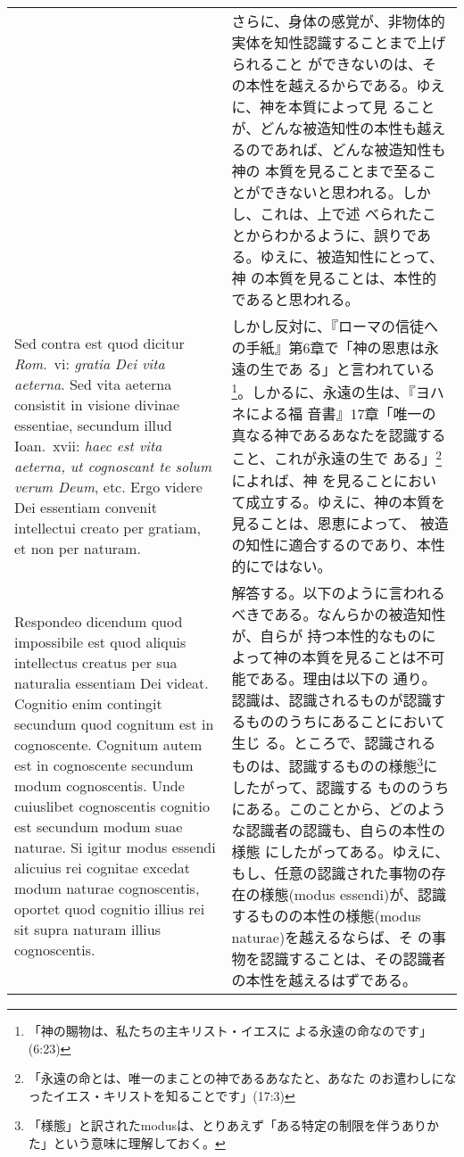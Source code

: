 \documentclass[10pt]{jsarticle} %
\begin{document}
\begin{longtable}{p{21em}p{21em}}
&

さらに、身体の感覚が、非物体的実体を知性認識することまで上げられること
ができないのは、その本性を越えるからである。ゆえに、神を本質によって見
ることが、どんな被造知性の本性も越えるのであれば、どんな被造知性も神の
本質を見ることまで至ることができないと思われる。しかし、これは、上で述
べられたことからわかるように、誤りである。ゆえに、被造知性にとって、神
の本質を見ることは、本性的であると思われる。

\\

{\sc Sed contra est} quod dicitur {\it Rom}.\ {\sc vi}: {\it gratia
Dei vita aeterna}. Sed vita aeterna consistit in visione divinae
essentiae, secundum illud Ioan.\ {\sc xvii}: {\it haec est vita
aeterna, ut cognoscant te solum verum Deum}, etc. Ergo videre Dei
essentiam convenit intellectui creato per gratiam, et non per naturam.

&

しかし反対に、『ローマの信徒への手紙』第6章で「神の恩恵は永遠の生であ
る」と言われている\footnote{「神の賜物は、私たちの主キリスト・イエスに
よる永遠の命なのです」(6:23)}。しかるに、永遠の生は、『ヨハネによる福
音書』17章「唯一の真なる神であるあなたを認識すること、これが永遠の生で
ある」\footnote{「永遠の命とは、唯一のまことの神であるあなたと、あなた
のお遣わしになったイエス・キリストを知ることです」(17:3)}によれば、神
を見ることにおいて成立する。ゆえに、神の本質を見ることは、恩恵によって、
被造の知性に適合するのであり、本性的にではない。

\\

{\sc Respondeo dicendum} quod impossibile est quod aliquis intellectus
creatus per sua naturalia essentiam Dei videat. Cognitio enim
contingit secundum quod cognitum est in cognoscente. Cognitum autem
est in cognoscente secundum modum cognoscentis. Unde cuiuslibet
cognoscentis cognitio est secundum modum suae naturae. Si igitur modus
essendi alicuius rei cognitae excedat modum naturae cognoscentis,
oportet quod cognitio illius rei sit supra naturam illius
cognoscentis.

&

解答する。以下のように言われるべきである。なんらかの被造知性が、自らが
持つ本性的なものによって神の本質を見ることは不可能である。理由は以下の
通り。認識は、認識されるものが認識するもののうちにあることにおいて生じ
る。ところで、認識されるものは、認識するものの様態\footnote{「様態」と訳されたmodusは、とりあえず「ある特定の制限を伴うありかた」という意味に理解しておく。}にしたがって、認識する
もののうちにある。このことから、どのような認識者の認識も、自らの本性の様態
にしたがってある。ゆえに、もし、任意の認識された事物の存在の様態(modus
essendi)が、認識するものの本性の様態(modus naturae)を越えるならば、そ
の事物を認識することは、その認識者の本性を越えるはずである。


\end{longtable}
\end{document}
